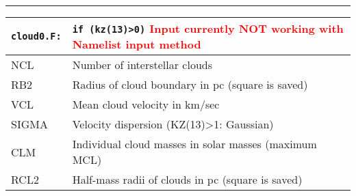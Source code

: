 
\hrule
\noindent
\begin{longtable}{@{}p{1.5cm}p{13.0cm}}
\texttt{cloud0.F:}& \texttt{if (kz(13)>0)} 
\textcolor{red}{Input currently NOT working with Namelist input method}
\\\hline
%
NCL   &  Number of interstellar clouds \\
RB2   &  Radius of cloud boundary in pc (square is saved) \\
VCL   &  Mean cloud velocity in km/sec \\
SIGMA &  Velocity dispersion (KZ(13)>1: Gaussian) \\
CLM   &  Individual cloud masses in solar masses (maximum MCL) \\
RCL2  &  Half-mass radii of clouds in pc (square is saved) \\
\end{longtable}
